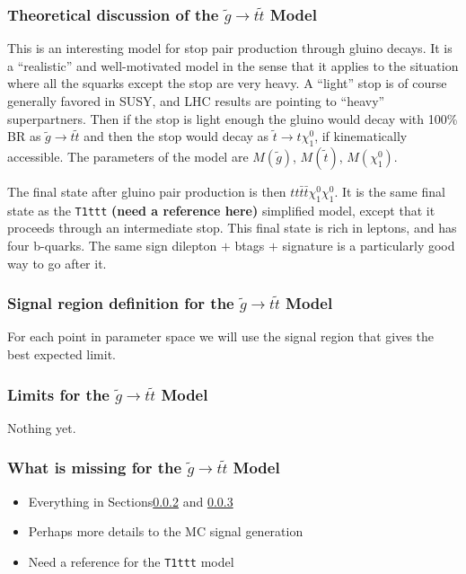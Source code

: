 \subsubsection{Theoretical discussion of the $\widetilde{g} \to t\widetilde{t}$ Model}
\label{sec:firststopmodeltheory}

This is an interesting model for stop pair production through gluino 
decays\cite{susybtags}\cite{susybtags2}\cite{wacker}\cite{naturalness4}.
It is a ``realistic'' and well-motivated 
model in the sense that it applies to the situation 
where all the squarks except the stop are very heavy.  A ``light'' stop is of course
generally favored in SUSY, and LHC results are pointing to ``heavy'' superpartners.
Then if the stop
is light enough the gluino would decay with 100\% BR as $\widetilde{g} \to t\widetilde{t}$
and then the stop would decay as $\widetilde{t} \to t \chi_1^0$, if kinematically 
accessible.
The parameters of the model are $M(\widetilde{g})$, $M(\widetilde{t})$, $M(\chi_1^0)$.

The final state after gluino pair production is then $tt\bar{t}\bar{t}\chi_1^0\chi_1^0$.
It is the same final state as the {\tt T1ttt} {\bf (need a reference here)}
simplified model, except that 
it proceeds through an intermediate stop.  This final state is rich in leptons,
and has four b-quarks.  The same sign dilepton $+$ btags $+$ \met signature is a 
particularly good way to go after it.


\subsubsection{Signal region definition for the $\widetilde{g} \to t\widetilde{t}$ Model}
\label{sec:firststopdefinition}
For each point in parameter space we will use the signal region that gives
the best expected limit.

\subsubsection{Limits for the $\widetilde{g} \to t\widetilde{t}$ Model}
\label{sec:firststoplimits}
Nothing yet.

\subsubsection{What is missing for the $\widetilde{g} \to t\widetilde{t}$ Model}
\begin{itemize}
\item Everything in Sections\ref{sec:firststopdefinition} and \ref{sec:firststoplimits}
\item Perhaps more details to the MC signal generation
\item Need a reference for the {\tt T1ttt} model
\end{itemize}

